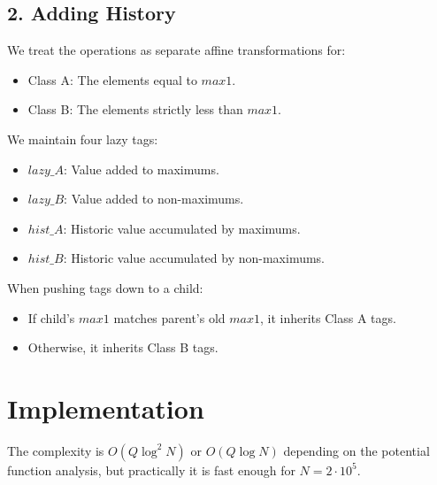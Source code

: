 \documentclass[11pt]{article}
\begin{document}
\subsection*{2. Adding History}
We treat the operations as separate affine transformations for:
\begin{itemize}
    \item Class A: The elements equal to $max1$.
    \item Class B: The elements strictly less than $max1$.
\end{itemize}
We maintain four lazy tags:
\begin{itemize}
    \item $lazy\_A$: Value added to maximums.
    \item $lazy\_B$: Value added to non-maximums.
    \item $hist\_A$: Historic value accumulated by maximums.
    \item $hist\_B$: Historic value accumulated by non-maximums.
\end{itemize}

When pushing tags down to a child:
\begin{itemize}
    \item If child's $max1$ matches parent's old $max1$, it inherits Class A tags.
    \item Otherwise, it inherits Class B tags.
\end{itemize}

\section*{Implementation}
The complexity is $O(Q \log^2 N)$ or $O(Q \log N)$ depending on the potential function analysis, but practically it is fast enough for $N=2 \cdot 10^5$.
\end{document}
